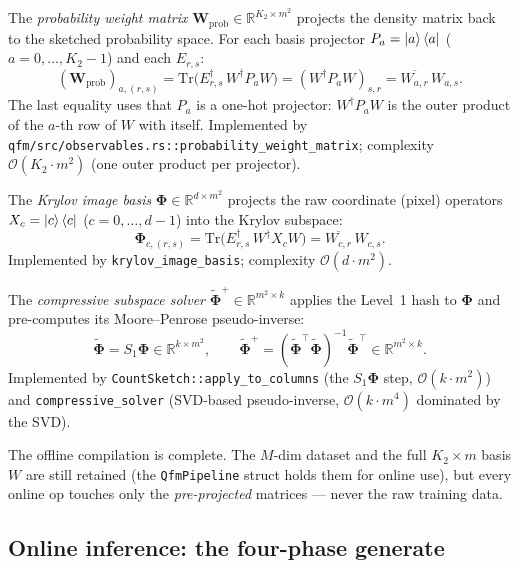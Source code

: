 \documentclass[11pt, a4paper]{article}
\newcommand{\Rset}{\mathbb{R}}
\begin{document}
The \emph{probability weight matrix} $\mathbf{W}_{\mathrm{prob}}\in\Rset^{K_2\times m^2}$
projects the density matrix back to the sketched probability space. For each
basis projector $P_a=\ket{a}\bra{a}$ ($a=0,\dots,K_2-1$) and each
$E_{r,s}$:
\begin{equation}
  (\mathbf{W}_{\mathrm{prob}})_{a,(r,s)}
  =\mathrm{Tr}\bigl(E_{r,s}^\dagger\,W^\dagger P_a W\bigr)
  =(W^\dagger P_a W)_{s,r}
  =\overline{W_{a,r}}\,W_{a,s}.
\end{equation}
The last equality uses that $P_a$ is a one-hot projector: $W^\dagger P_a W$ is
the outer product of the $a$-th row of $W$ with itself. Implemented by
\texttt{qfm/src/observables.rs::probability\_weight\_matrix}; complexity
$\mathcal{O}(K_2\cdot m^2)$ (one outer product per projector).

The \emph{Krylov image basis} $\mathbf\Phi\in\Rset^{d\times m^2}$ projects
the raw coordinate (pixel) operators $X_c=\ket{c}\bra{c}$ ($c=0,\dots,d-1$)
into the Krylov subspace:
\begin{equation}
  \mathbf\Phi_{c,(r,s)}=\mathrm{Tr}\bigl(E_{r,s}^\dagger\,W^\dagger X_c W\bigr)
  =\overline{W_{c,r}}\,W_{c,s}.
\end{equation}
Implemented by \texttt{krylov\_image\_basis}; complexity $\mathcal{O}(d\cdot m^2)$.

The \emph{compressive subspace solver} $\tilde{\mathbf\Phi}^+\in\Rset^{m^2\times k}$
applies the Level~1 hash to $\mathbf\Phi$ and pre-computes its
Moore--Penrose pseudo-inverse:
\begin{equation}
  \tilde{\mathbf\Phi}=S_1\mathbf\Phi\in\Rset^{k\times m^2},\qquad
  \tilde{\mathbf\Phi}^+=(\tilde{\mathbf\Phi}^\top\tilde{\mathbf\Phi})^{-1}
  \tilde{\mathbf\Phi}^\top\in\Rset^{m^2\times k}.
\end{equation}
Implemented by \texttt{CountSketch::apply\_to\_columns} (the $S_1\mathbf\Phi$
step, $\mathcal{O}(k\cdot m^2)$) and \texttt{compressive\_solver} (SVD-based
pseudo-inverse, $\mathcal{O}(k\cdot m^4)$ dominated by the SVD).

The offline compilation is complete. The $M$-dim dataset and the full
$K_2\times m$ basis $W$ are still retained (the \texttt{QfmPipeline} struct
holds them for online use), but every online op touches only the
\emph{pre-projected} matrices --- never the raw training data.

\subsection{Online inference: the four-phase generate}
\end{document}
